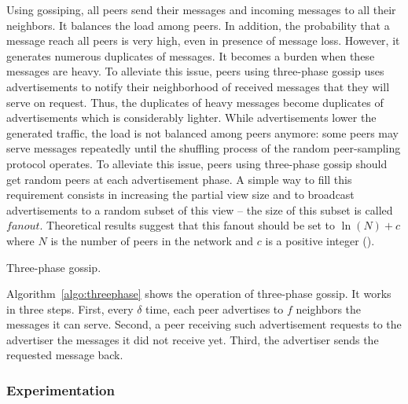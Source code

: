 Using gossiping, all peers send their messages and incoming messages to all
their neighbors. It balances the load among peers. In addition, the probability
that a message reach all peers is very high, even in presence of message loss.
However, it generates numerous duplicates of messages. It becomes a burden when
these messages are heavy. To alleviate this issue, peers using three-phase
gossip uses advertisements to notify their neighborhood of received messages
that they will serve on request. Thus, the duplicates of heavy messages become
duplicates of advertisements which is considerably lighter. While advertisements
lower the generated traffic, the load is not balanced among peers anymore: some
peers may serve messages repeatedly until the shuffling process of the random
peer-sampling protocol operates. To alleviate this issue, peers using
three-phase gossip should get random peers at each advertisement phase. A simple
way to fill this requirement consists in increasing the partial view size and to
broadcast advertisements to a random subset of this view -- the size of this
subset is called $fanout$. Theoretical results suggest that this fanout should
be set to $\ln(N)+c$ where $N$ is the number of peers in the network and $c$ is
a positive integer (\REF).

\begin{algorithm}[h]
  
  \caption{\label{algo:threephase}Three-phase gossip.}
\end{algorithm}

Algorithm~\ref{algo:threephase} shows the operation of three-phase gossip. It
works in three steps. First, every $\delta$ time, each peer advertises to $f$
neighbors the messages it can serve. Second, a peer receiving such advertisement
requests to the advertiser the messages it did not receive yet. Third, the
advertiser sends the requested message back.

\subsubsection{Experimentation}

